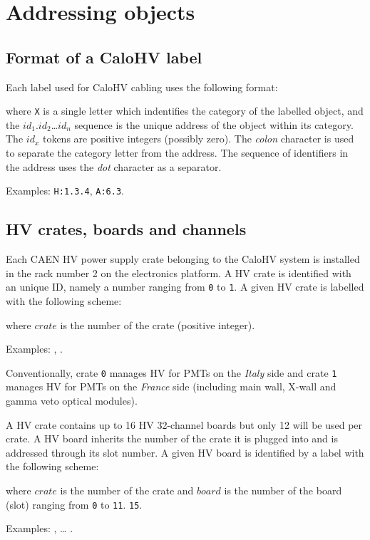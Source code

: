 
\section{Addressing objects}

\subsection{Format of a CaloHV label}

Each label used for CaloHV cabling uses the following format:

\begin{center}
\end{center}
\noindent  where \texttt{X}  is a single letter  which indentifies  the
category  of the  labelled  object,  and the  $id_1$.$id_2$\dots$id_n$
sequence is the unique address of the object within its category.  The
$id_x$ tokens are positive integers (possibly zero).  The \emph{colon}
character is  used to separate  the category letter from  the address.
The  sequence  of  identifiers  in  the  address  uses  the  \emph{dot}
character as a separator.

\vskip 10pt Examples: \texttt{H:1.3.4}, \texttt{A:6.3}.


\subsection{HV crates, boards and channels}

Each CAEN  HV power  supply crate  belonging to  the CaloHV  system is
installed in  the rack  number 2  on the  electronics platform.   A HV
crate is  identified with an unique  ID, namely a number  ranging from
\texttt{0}  to \texttt{1}.   A given  HV  crate is  labelled with  the
following scheme:
\begin{center}
 \end{center}
where \texttt{$crate$} is the number of the crate (positive integer).
\vskip     10pt    \par\noindent     Examples:    ,
.  \par Conventionally, crate \texttt{0} manages HV
for PMTs on the \emph{Italy} side  and crate \texttt{1} manages HV for
PMTs on the \emph{France} side  (including main wall, X-wall and gamma
veto optical modules).

\vskip 10pt A HV crate contains up to 16 HV 32-channel boards but only
12 will  be used  per crate.  A  HV board inherits  the number  of the
crate it is plugged into and  is addressed through its slot number.  A
given HV board is identified by a label with the following scheme:
\begin{center}
 \end{center}
where \texttt{$crate$} is the number of the crate and \texttt{$board$}
is  the  number  of  the  board  (slot)
ranging from \texttt{0} to \texttt{11}.
\texttt{15}.
\vskip 10pt
\par\noindent Examples: ,  \dots
{}.

